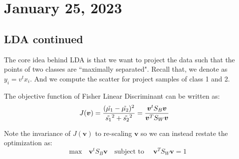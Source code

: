 \newpage
\section{January 25, 2023}
\subsection{LDA continued}
The core idea behind LDA is that we want to project the data such that the points of two classes are ``maximally separated".
Recall that, we denote  as $y_i = v^t x_i$. And we compute the scatter for project samples of class 1 and 2. 
\begin{definition}
    The objective function of Fisher Linear Discriminant can be written as:
    \begin{align*}
        J(\boldsymbol{v}) &= \frac{(\Tilde{\mu_1} - \Tilde{\mu_2})^2}{\Tilde{s_1}^2  + \Tilde{s_2}^2} 
        = \frac{\boldsymbol{v}^t S_B \boldsymbol{v}}{\boldsymbol{v}^T S_W \boldsymbol{v}}
    \end{align*}
\end{definition}
    Note the invariance of $J(\boldsymbol{v})$ to re-scaling $\boldsymbol{v}$ so we can instead restate the optimization as:
    $$
    \text{max} \quad \boldsymbol{v}^t S_B \boldsymbol{v} \quad \text{subject to } 
    \quad \boldsymbol{v}^T S_W \boldsymbol{v} = 1
    $$